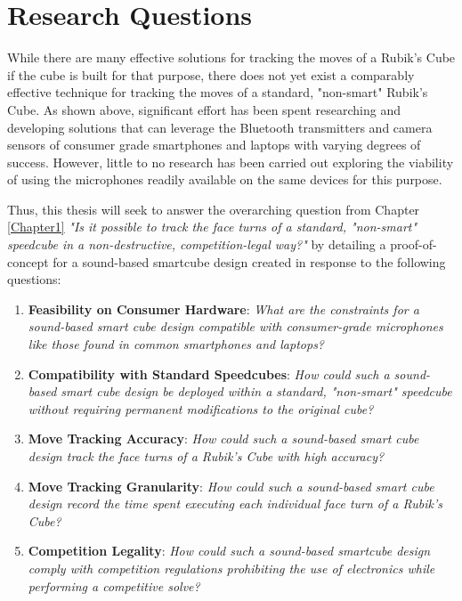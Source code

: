 \section{Research Questions}
\label{sec:research-questions}
While there are many effective solutions for tracking the moves of a Rubik's Cube if the cube is built for that purpose, there does not yet exist a comparably effective technique for tracking the moves of a standard, "non-smart" Rubik's Cube.
As shown above, significant effort has been spent researching and developing solutions that can leverage the Bluetooth transmitters and camera sensors of consumer grade smartphones and laptops with varying degrees of success.
However, little to no research has been carried out exploring the viability of using the microphones readily available on the same devices for this purpose.

Thus, this thesis will seek to answer the overarching question from Chapter \ref{Chapter1} \emph{"Is it possible to track the face turns of a standard, "non-smart" speedcube in a non-destructive, competition-legal way?"} by detailing a proof-of-concept for a sound-based smartcube design created in response to the following questions:

\begin{enumerate}
    \item \textbf{Feasibility on Consumer Hardware}: \emph{What are the constraints for a sound-based smart cube design compatible with consumer-grade microphones like those found in common smartphones and laptops?}
    \item \textbf{Compatibility with Standard Speedcubes}: \emph{How could such a sound-based smart cube design be deployed within a standard, "non-smart" speedcube without requiring permanent modifications to the original cube?} %
    \item \textbf{Move Tracking Accuracy}: \emph{How could such a sound-based smart cube design track the face turns of a Rubik's Cube with high accuracy?} %
    \item \textbf{Move Tracking Granularity}: \emph{How could such a sound-based smart cube design record the time spent executing each individual face turn of a Rubik's Cube?}
    \item \textbf{Competition Legality}: \emph{How could such a sound-based smartcube design comply with competition regulations prohibiting the use of electronics while performing a competitive solve?}
\end{enumerate}

